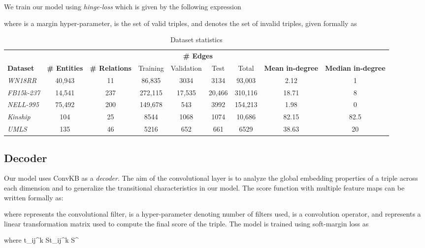 \documentclass[11pt,a4paper]{article}
\begin{document}
We train our model using \emph{hinge-loss} which is given by the following expression

where  is a margin hyper-parameter,  is the set of valid triples, and  denotes the set of invalid triples, given formally as 

\begin{table*}[t!]
	\centering\small
	\begin{tabular}{l|cccccccc}
		\hline
		&               &              & \multicolumn{4}{c}{ \textbf{\# Edges}} \\ 
		\cline{4-7}
		\textbf{Dataset}   &  \textbf{\# Entities}  & \textbf{\# Relations}  & Training  & Validation  & Test & Total & \textbf{Mean in-degree} & \textbf{Median in-degree}\\ 
		\hline
		\emph{WN18RR}    & 40,943 & 11  & 86,835   & 3034   & 3134   & 93,003  & 2.12  & 1 \\ 
		\emph{FB15k-237} & 14,541 & 237 & 272,115  & 17,535 & 20,466 & 310,116 & 18.71 & 8  \\ 
		\emph{NELL-995}  & 75,492 & 200 & 149,678  & 543    & 3992   & 154,213 & 1.98  & 0   \\
		\emph{Kinship}   & 104    & 25  & 8544     & 1068   & 1074   & 10,686  & 82.15 & 82.5 \\
		\emph{UMLS}      & 135    & 46  & 5216     & 652    & 661    & 6529    & 38.63 & 20    \\
		\hline
	\end{tabular}
	\caption{Dataset statistics}
	\label{tb:datasets}
\end{table*}
\subsection{Decoder}
Our model uses ConvKB \cite{nguyen2018novel} as a \emph{decoder}. 
The aim of the convolutional layer is to analyze the global embedding properties of a triple  across each dimension and to generalize the transitional characteristics in our model. 
The score function with multiple feature maps can be written formally as:

where  represents the  convolutional filter,  is a hyper-parameter denoting number of filters used,  is a convolution operator, and  represents a linear transformation matrix used to compute the final score of the triple. 
The model is trained using soft-margin loss as 

where t_{ij}^{k} \in St_{ij}^{k} \in S^{\prime}
\end{document}
